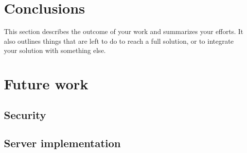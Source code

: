 \section{Conclusions}
This section describes the outcome of your work and summarizes your efforts. It also outlines things that are left to do to reach a full solution, or to integrate your solution with something else.
\section{Future work}
\subsection{Security}
\subsection{Server implementation}
